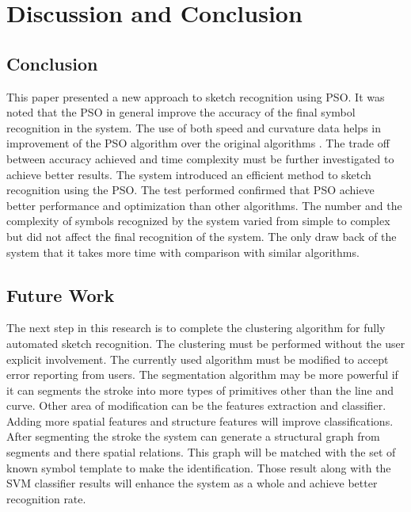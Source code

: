 \chapter{Discussion and Conclusion}


\section{Conclusion}
\label{sec:ConclusionConclusion }

This paper presented a new approach to sketch recognition using PSO. It was noted that the PSO in general improve the accuracy of the final symbol recognition in the system. The use of both speed and curvature data helps in improvement of the PSO algorithm over the original algorithms \cite{CruveDivisionSwarm,PolygonApproximationPSO}. The trade off between accuracy achieved and time complexity must be further investigated to achieve better results.  The system introduced an efficient method to sketch recognition using the PSO. The test performed confirmed that PSO achieve better performance and optimization than other algorithms. The number and the complexity of symbols recognized by the system varied from simple to complex but did not affect the final recognition of the system. The only draw back of the system that it takes more time with comparison with similar algorithms. 


\newpage

\section{Future Work}
\label{sec:FutureWork}


The next step in this research is to complete the clustering algorithm for fully automated sketch recognition. The clustering must be performed without the user explicit involvement.  The currently used algorithm must be modified to accept error reporting from users. The segmentation algorithm may be more powerful if it can segments the stroke into more types of primitives other than the line and curve. Other area of modification can be the features extraction and classifier. Adding more spatial features and structure features will improve classifications. After segmenting the stroke the system can generate a structural graph from segments and there spatial relations. This graph will be matched with the set of known symbol template to make the identification. Those result along with the SVM classifier results will enhance the system as a whole and achieve better recognition rate.  %